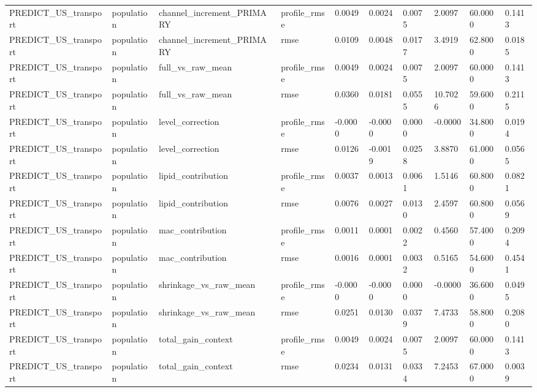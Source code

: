 {\begin{longtable}{llllllllll}
PREDICT\_US\_transport & population & channel\_increment\_PRIMARY & profile\_rmse & 0.0049 & 0.0024 & 0.0075 & 2.0097 & 60.0000 & 0.1413 \\
PREDICT\_US\_transport & population & channel\_increment\_PRIMARY & rmse & 0.0109 & 0.0048 & 0.0177 & 3.4919 & 62.8000 & 0.0185 \\
PREDICT\_US\_transport & population & full\_vs\_raw\_mean & profile\_rmse & 0.0049 & 0.0024 & 0.0075 & 2.0097 & 60.0000 & 0.1413 \\
PREDICT\_US\_transport & population & full\_vs\_raw\_mean & rmse & 0.0360 & 0.0181 & 0.0555 & 10.7026 & 59.6000 & 0.2115 \\
PREDICT\_US\_transport & population & level\_correction & profile\_rmse & -0.0000 & -0.0000 & 0.0000 & -0.0000 & 34.8000 & 0.0194 \\
PREDICT\_US\_transport & population & level\_correction & rmse & 0.0126 & -0.0019 & 0.0258 & 3.8870 & 61.0000 & 0.0565 \\
PREDICT\_US\_transport & population & lipid\_contribution & profile\_rmse & 0.0037 & 0.0013 & 0.0061 & 1.5146 & 60.8000 & 0.0821 \\
PREDICT\_US\_transport & population & lipid\_contribution & rmse & 0.0076 & 0.0027 & 0.0130 & 2.4597 & 60.8000 & 0.0569 \\
PREDICT\_US\_transport & population & mac\_contribution & profile\_rmse & 0.0011 & 0.0001 & 0.0022 & 0.4560 & 57.4000 & 0.2094 \\
PREDICT\_US\_transport & population & mac\_contribution & rmse & 0.0016 & 0.0001 & 0.0032 & 0.5165 & 54.6000 & 0.4541 \\
PREDICT\_US\_transport & population & shrinkage\_vs\_raw\_mean & profile\_rmse & -0.0000 & -0.0000 & 0.0000 & -0.0000 & 36.6000 & 0.0495 \\
PREDICT\_US\_transport & population & shrinkage\_vs\_raw\_mean & rmse & 0.0251 & 0.0130 & 0.0379 & 7.4733 & 58.8000 & 0.2080 \\
PREDICT\_US\_transport & population & total\_gain\_context & profile\_rmse & 0.0049 & 0.0024 & 0.0075 & 2.0097 & 60.0000 & 0.1413 \\
PREDICT\_US\_transport & population & total\_gain\_context & rmse & 0.0234 & 0.0131 & 0.0334 & 7.2453 & 67.0000 & 0.0039 \\
\bottomrule
\end{longtable}}
